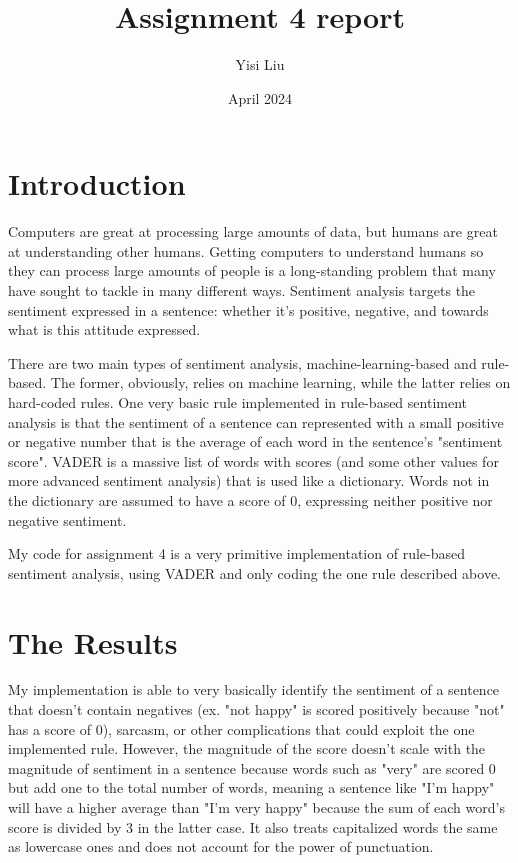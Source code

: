 \documentclass{article}
\title{Assignment 4 report}
\author{Yisi Liu}
\date{April 2024}
\begin{document}
\maketitle

\section{Introduction}

Computers are great at processing large amounts of data, but humans are great at understanding other humans. Getting computers to understand humans so they can process large amounts of people is a long-standing problem that many have sought to tackle in many different ways. Sentiment analysis targets the sentiment expressed in a sentence: whether it's positive, negative, and towards what is this attitude expressed. 

There are two main types of sentiment analysis, machine-learning-based and rule-based. The former, obviously, relies on machine learning, while the latter relies on hard-coded rules. One very basic rule implemented in rule-based sentiment analysis is that the sentiment of a sentence can represented with a small positive or negative number that is the average of each word in the sentence's "sentiment score". VADER is a massive list of words with scores (and some other values for more advanced sentiment analysis) that is used like a dictionary. Words not in the dictionary are assumed to have a score of 0, expressing neither positive nor negative sentiment. 

My code for assignment 4 is a very primitive implementation of rule-based sentiment analysis, using VADER and only coding the one rule described above. 

\section{The Results}

My implementation is able to very basically identify the sentiment of a sentence that doesn't contain negatives (ex. "not happy" is scored positively because "not" has a score of 0), sarcasm, or other complications that could exploit the one implemented rule. However, the magnitude of the score doesn't scale with the magnitude of sentiment in a sentence because words such as "very" are scored 0 but add one to the total number of words, meaning a sentence like "I'm happy" will have a higher average than "I'm very happy" because the sum of each word's score is divided by 3 in the latter case. It also treats capitalized words the same as lowercase ones and does not account for the power of punctuation. 
\end{document}

